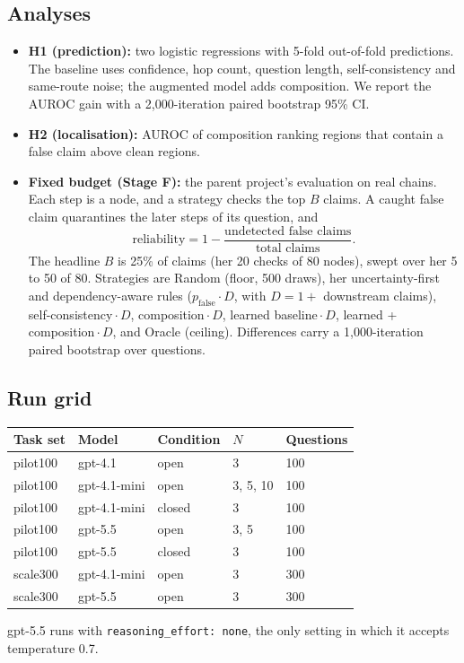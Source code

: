 \documentclass[11pt]{article}
\newcommand{\code}[1]{\texttt{#1}}
\begin{document}
\subsection{Analyses}
\begin{itemize}
  \item \textbf{H1 (prediction):} two logistic regressions with 5-fold out-of-fold
        predictions. The baseline uses confidence, hop count, question length,
        self-consistency and same-route noise; the augmented model adds composition. We
        report the AUROC gain with a 2,000-iteration paired bootstrap 95\% CI.
  \item \textbf{H2 (localisation):} AUROC of composition ranking regions that contain a
        false claim above clean regions.
  \item \textbf{Fixed budget (Stage F):} the parent project's evaluation on real chains.
        Each step is a node, and a strategy checks the top $B$ claims. A caught false claim
        quarantines the later steps of its question, and
        \begin{equation}
          \text{reliability} = 1 - \frac{\text{undetected false claims}}{\text{total claims}}.
        \end{equation}
        The headline $B$ is 25\% of claims (her 20 checks of 80 nodes), swept over her 5 to
        50 of 80. Strategies are Random (floor, 500 draws), her uncertainty-first and
        dependency-aware rules ($p_{\text{false}} \cdot D$, with $D = 1 +$ downstream
        claims), self-consistency${}\cdot D$, composition${}\cdot D$, learned
        baseline${}\cdot D$, learned + composition${}\cdot D$, and Oracle (ceiling).
        Differences carry a 1,000-iteration paired bootstrap over questions.
\end{itemize}

\subsection{Run grid}
\begin{center}
\small
\begin{tabular}{lllll}
\toprule
Task set & Model & Condition & $N$ & Questions \\
\midrule
pilot100 & gpt-4.1 & open & 3 & 100 \\
pilot100 & gpt-4.1-mini & open & 3, 5, 10 & 100 \\
pilot100 & gpt-4.1-mini & closed & 3 & 100 \\
pilot100 & gpt-5.5 & open & 3, 5 & 100 \\
pilot100 & gpt-5.5 & closed & 3 & 100 \\
scale300 & gpt-4.1-mini & open & 3 & 300 \\
scale300 & gpt-5.5 & open & 3 & 300 \\
\bottomrule
\end{tabular}
\end{center}
gpt-5.5 runs with \code{reasoning\_effort: none}, the only setting in which it accepts
temperature 0.7.
\end{document}
